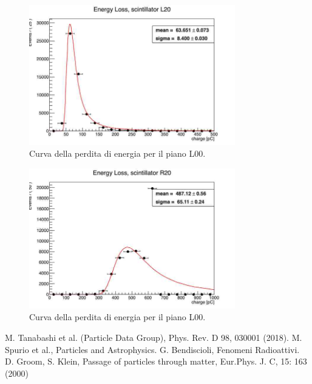 \begin{figure}[H]
  \centering
  \includegraphics[width=0.8\textwidth]{plots/energy_L20.jpg}
  \caption{Curva della perdita di energia per il piano L00.}
  \label{fig:l20}
\end{figure}

\begin{figure}[H]
  \centering
  \includegraphics[width=0.8\textwidth]{plots/energy_R20.jpg}
  \caption{Curva della perdita di energia per il piano L00.}
  \label{fig:r20}
\end{figure}


\begin{thebibliography}{90}             %
\rhead[\fancyplain{}{\bfseries \leftmark}]{\fancyplain{}{\bfseries
\thepage}}
 M. Tanabashi et al. (Particle Data Group), Phys. Rev. D 98, 030001 (2018).
 M. Spurio et al., Particles and Astrophysics.  
 G. Bendiscioli, Fenomeni Radioattivi.
 D. Groom, S. Klein, Passage of particles through matter, Eur.Phys. J. C, 15: 163 (2000) 
\end{thebibliography}

